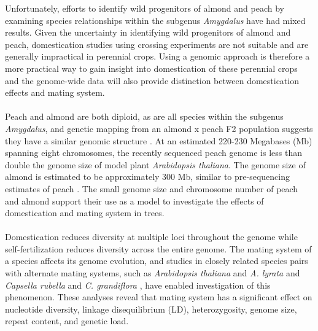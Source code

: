 \documentclass[12pt]{article}
\begin{document}
%
Unfortunately, efforts to identify wild progenitors of almond and peach \citep{verde2013high, aradhya2004molecular, zeinalabedini2010origin, mowrey1990isozyme, browicz1996genus, ladizinsky1999origin, bassi20081} by examining species relationships within the subgenus \emph{Amygdalus} have had mixed results. 
%
Given the uncertainty in identifying wild progenitors of almond and peach, domestication studies using crossing experiments are not suitable and are generally impractical in perennial crops.
%
Using a genomic approach is therefore a more practical way to gain insight into domestication of these perennial crops and the genome-wide data will also provide distinction between domestication effects and mating system.
%
\\
\\
%
Peach and almond are both diploid, as are all species within the subgenus \emph{Amygdalus}, and genetic mapping from an almond x peach F2 population suggests they have a similar genomic structure \citep{dirlewanger2004comparative}. 
%
At an estimated 220-230 Megabases (Mb) spanning eight chromosomes, the recently sequenced peach genome \citep{verde2013high} is less than double the genome size of model plant \emph{Arabidopsis thaliana}.
%
The genome size of almond is estimated to be approximately 300 Mb, similar to pre-sequencing estimates of peach \citep{arumuganathan1991nuclear}. 
%
The small genome size and chromosome number of peach and almond support their use as a model to investigate the effects of domestication and mating system in trees.
%
\\
\\
Domestication reduces diversity at multiple loci throughout the genome \citep{glemin2006impact, doebley2006molecular, slotte2013capsella} while self-fertilization reduces diversity across the entire genome.
%
The mating system of a species affects its genome evolution, and studies in closely related species pairs with alternate mating systems, such as \emph{Arabidopsis thaliana} and \emph{A. lyrata} and \emph{Capsella rubella} and \emph{C. grandiflora} \citep{slotte2013capsella}, have enabled investigation of this phenomenon. 
%
These analyses reveal that mating system has a significant effect on nucleotide diversity, linkage disequilibrium (LD), heterozygosity, genome size, repeat content, and genetic load. 
\end{document}
